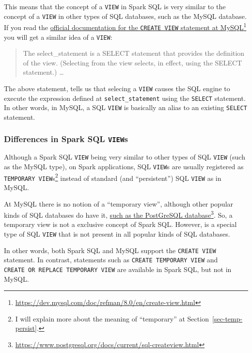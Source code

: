 \documentclass[
  11pt,
  letterpaper,
  DIV=11,
  numbers=noendperiod]{scrreprt}
\begin{document}
This means that the concept of a \texttt{VIEW} in Spark SQL is very
similar to the concept of a \texttt{VIEW} in other types of SQL
databases, such as the MySQL database. If you read the
\href{https://dev.mysql.com/doc/refman/8.0/en/create-view.html}{official
documentation for the \texttt{CREATE\ VIEW} statement at
MySQL}\footnote{\url{https://dev.mysql.com/doc/refman/8.0/en/create-view.html}}
you will get a similar idea of a \texttt{VIEW}:

\begin{quote}
The select\_statement is a SELECT statement that provides the definition
of the view. (Selecting from the view selects, in effect, using the
SELECT statement.) \ldots{}
\end{quote}

The above statement, tells us that selecing a \texttt{VIEW} causes the
SQL engine to execute the expression defined at
\texttt{select\_statement} using the \texttt{SELECT} statement. In other
words, in MySQL, a SQL \texttt{VIEW} is basically an alias to an
existing \texttt{SELECT} statement.

\subsubsection{\texorpdfstring{Differences in Spark SQL
\texttt{VIEW}s}{Differences in Spark SQL VIEWs}}\label{differences-in-spark-sql-views}

Although a Spark SQL \texttt{VIEW} being very similar to other types of
SQL \texttt{VIEW} (such as the MySQL type), on Spark applications, SQL
\texttt{VIEW}s are usually registered as
\texttt{TEMPORARY\ VIEW}s\footnote{I will explain more about the meaning
  of ``temporary'' at Section~\ref{sec-temp-persist}.} instead of
standard (and ``persistent'') SQL \texttt{VIEW} as in MySQL.

At MySQL there is no notion of a ``temporary view'', although other
popular kinds of SQL databases do have it,
\href{https://www.postgresql.org/docs/current/sql-createview.html}{such
as the PostGreSQL database}\footnote{\url{https://www.postgresql.org/docs/current/sql-createview.html}}.
So, a temporary view is not a exclusive concept of Spark SQL. However,
is a special type of SQL \texttt{VIEW} that is not present in all
popular kinds of SQL databases.

In other words, both Spark SQL and MySQL support the
\texttt{CREATE\ VIEW} statement. In contrast, statements such as
\texttt{CREATE\ TEMPORARY\ VIEW} and
\texttt{CREATE\ OR\ REPLACE\ TEMPORARY\ VIEW} are available in Spark
SQL, but not in MySQL.
\end{document}

